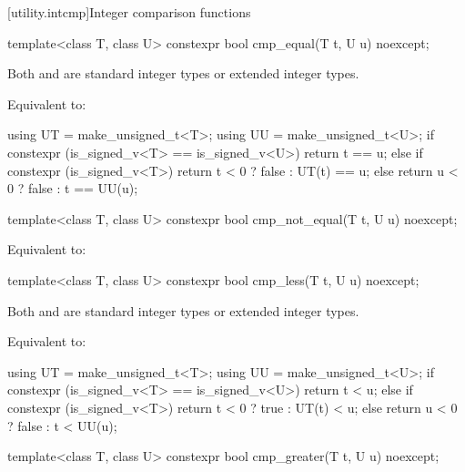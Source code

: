 [utility.intcmp]{Integer comparison functions}

%
\begin{itemdecl}
template<class T, class U>
  constexpr bool cmp_equal(T t, U u) noexcept;
\end{itemdecl}

\begin{itemdescr}
\pnum
\mandates
Both  and  are standard integer types or
extended integer types.

\pnum
\effects
Equivalent to:
\begin{codeblock}
using UT = make_unsigned_t<T>;
using UU = make_unsigned_t<U>;
if constexpr (is_signed_v<T> == is_signed_v<U>)
  return t == u;
else if constexpr (is_signed_v<T>)
  return t < 0 ? false : UT(t) == u;
else
  return u < 0 ? false : t == UU(u);
\end{codeblock}
\end{itemdescr}

%
\begin{itemdecl}
template<class T, class U>
  constexpr bool cmp_not_equal(T t, U u) noexcept;
\end{itemdecl}

\begin{itemdescr}
\pnum
\effects
Equivalent to: 
\end{itemdescr}

%
\begin{itemdecl}
template<class T, class U>
  constexpr bool cmp_less(T t, U u) noexcept;
\end{itemdecl}

\begin{itemdescr}
\pnum
\mandates
Both  and  are standard integer types or
extended integer types.

\pnum
\effects
Equivalent to:
\begin{codeblock}
using UT = make_unsigned_t<T>;
using UU = make_unsigned_t<U>;
if constexpr (is_signed_v<T> == is_signed_v<U>)
  return t < u;
else if constexpr (is_signed_v<T>)
  return t < 0 ? true : UT(t) < u;
else
  return u < 0 ? false : t < UU(u);
\end{codeblock}
\end{itemdescr}

%
\begin{itemdecl}
template<class T, class U>
  constexpr bool cmp_greater(T t, U u) noexcept;
\end{itemdecl}

